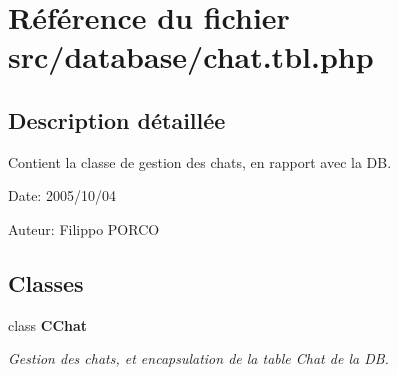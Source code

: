 \section{Référence du fichier src/database/chat.tbl.php}
\label{chat_8tbl_8php}


\subsection{Description détaillée}
Contient la classe de gestion des chats, en rapport avec la DB. 

\begin{Desc}
\item[Date:]2005/10/04\end{Desc}
\begin{Desc}
\item[Auteur:]Filippo PORCO \end{Desc}


\subsection*{Classes}
\begin{CompactItemize}
\item 
class {\bf CChat}
\begin{CompactList}\small\item\em Gestion des chats, et encapsulation de la table Chat de la DB. \item\end{CompactList}\end{CompactItemize}
